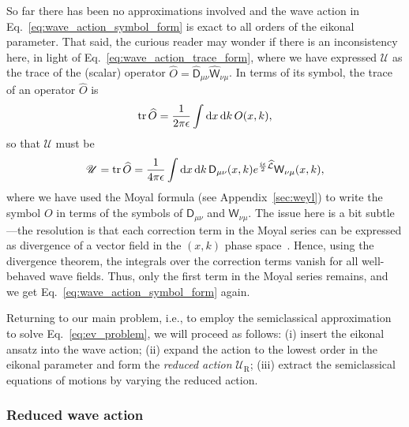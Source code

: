 So far there has been no approximations involved and the wave action in Eq.~\eqref{eq:wave_action_symbol_form} is exact to all orders of the eikonal parameter.
That said, the curious reader may wonder if there is an inconsistency here, in light of Eq.~\eqref{eq:wave_action_trace_form}, where we have expressed $\mathscr{U}$ as the trace of the (scalar) operator $\widehat{O} = \widehat{\mathsf{D}}_{\mu\nu}\widehat{\mathsf{W}}_{\nu\mu}$.
In terms of its symbol, the trace of an operator $\widehat{O}$ is
%
\begin{equation}
  \operatorname{tr}\widehat{O} = \frac{1}{2\pi\epsilon} \int \mathrm{d}{x}\,\mathrm{d}{k}\, O(x, k),
\end{equation}
%
so that $\mathscr{U}$ must be
%
\begin{equation}
  \mathscr{U} = \operatorname{tr}{\widehat{O}} = \frac{1}{4\pi\epsilon}\int \mathrm{d}{x}\,\mathrm{d}{k}\, \mathsf{D}_{\mu\nu}(x,k)e^{\frac{i\epsilon}{2}\widehat{\mathcal{L}}}\mathsf{W}_{\nu\mu}(x, k),
\end{equation}
%
where we have used the Moyal formula (see Appendix~\ref{sec:weyl}) to write the symbol $O$ in terms of the symbols of $\mathsf{D}_{\mu\nu}$ and $\mathsf{W}_{\nu\mu}$.
The issue here is a bit subtle---the resolution is that each correction term in the Moyal series can be expressed as divergence of a vector field in the $(x, k)$ phase space~\cite[Problem 3.16]{tracy2014}.
Hence, using the divergence theorem, the integrals over the correction terms vanish for all well-behaved wave fields.
Thus, only the first term in the Moyal series remains, and we get Eq.~\eqref{eq:wave_action_symbol_form} again.

Returning to our main problem, i.e., to employ the semiclassical approximation to solve Eq.~\eqref{eq:ev_problem}, we will proceed as follows: (i) insert the eikonal ansatz into the wave action; (ii) expand the action to the lowest order in the eikonal parameter and form the \emph{reduced action} $\mathscr{U}_{\text{R}}$; (iii) extract the semiclassical equations of motions by varying the reduced action.

\subsubsection*{Reduced wave action}
\label{page:redaction}

